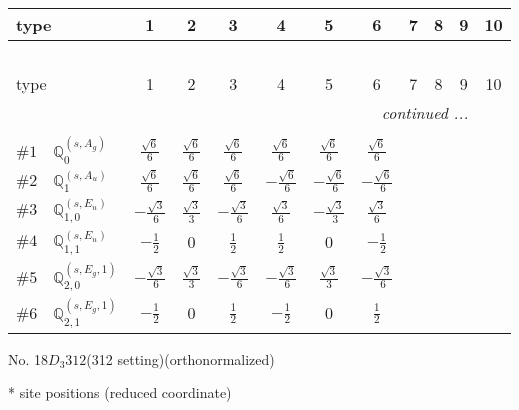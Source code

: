 \documentclass[fleqn,9pt,landscape]{jsarticle}
\begin{document}
\begin{center}
\renewcommand{\arraystretch}{1.3}
\begin{longtable}{lcccccccccc}
 \hline \hline
type & 1 & 2 & 3 & 4 & 5 & 6 & 7 & 8 & 9 & 10 \\ \hline \endfirsthead

\multicolumn{10}{l}{\tablename\ \thetable{}} \\
 \hline \hline
type & 1 & 2 & 3 & 4 & 5 & 6 & 7 & 8 & 9 & 10 \\ \hline \endhead

 \hline \hline
\multicolumn{10}{r}{\footnotesize\it continued ...} \\ \endfoot

 \hline \hline
\multicolumn{10}{r}{} \\ \endlastfoot

$ \#1\quad \mathbb{Q}_{0}^{(s,A_{g})} $ & $ \frac{\sqrt{6}}{6} $ & $ \frac{\sqrt{6}}{6} $ & $ \frac{\sqrt{6}}{6} $ & $ \frac{\sqrt{6}}{6} $ & $ \frac{\sqrt{6}}{6} $ & $ \frac{\sqrt{6}}{6} $ \\ \hline
$ \#2\quad \mathbb{Q}_{1}^{(s,A_{u})} $ & $ \frac{\sqrt{6}}{6} $ & $ \frac{\sqrt{6}}{6} $ & $ \frac{\sqrt{6}}{6} $ & $ - \frac{\sqrt{6}}{6} $ & $ - \frac{\sqrt{6}}{6} $ & $ - \frac{\sqrt{6}}{6} $ \\ \hline
$ \#3\quad \mathbb{Q}_{1,0}^{(s,E_{u})} $ & $ - \frac{\sqrt{3}}{6} $ & $ \frac{\sqrt{3}}{3} $ & $ - \frac{\sqrt{3}}{6} $ & $ \frac{\sqrt{3}}{6} $ & $ - \frac{\sqrt{3}}{3} $ & $ \frac{\sqrt{3}}{6} $ \\ \hline
$ \#4\quad \mathbb{Q}_{1,1}^{(s,E_{u})} $ & $ - \frac{1}{2} $ & $ 0 $ & $ \frac{1}{2} $ & $ \frac{1}{2} $ & $ 0 $ & $ - \frac{1}{2} $ \\ \hline
$ \#5\quad \mathbb{Q}_{2,0}^{(s,E_{g},1)} $ & $ - \frac{\sqrt{3}}{6} $ & $ \frac{\sqrt{3}}{3} $ & $ - \frac{\sqrt{3}}{6} $ & $ - \frac{\sqrt{3}}{6} $ & $ \frac{\sqrt{3}}{3} $ & $ - \frac{\sqrt{3}}{6} $ \\ \hline
$ \#6\quad \mathbb{Q}_{2,1}^{(s,E_{g},1)} $ & $ - \frac{1}{2} $ & $ 0 $ & $ \frac{1}{2} $ & $ - \frac{1}{2} $ & $ 0 $ & $ \frac{1}{2} $ \\
\end{longtable}
\end{center}
\newpage
\begin{center}
\LARGE
No. 18\quad$D_{3}$\quad$312$\quad(312 setting)\quad[ trigonal ] (orthonormalized)
\end{center}
\vspace{5mm}
* site positions (reduced coordinate)
\end{document}
